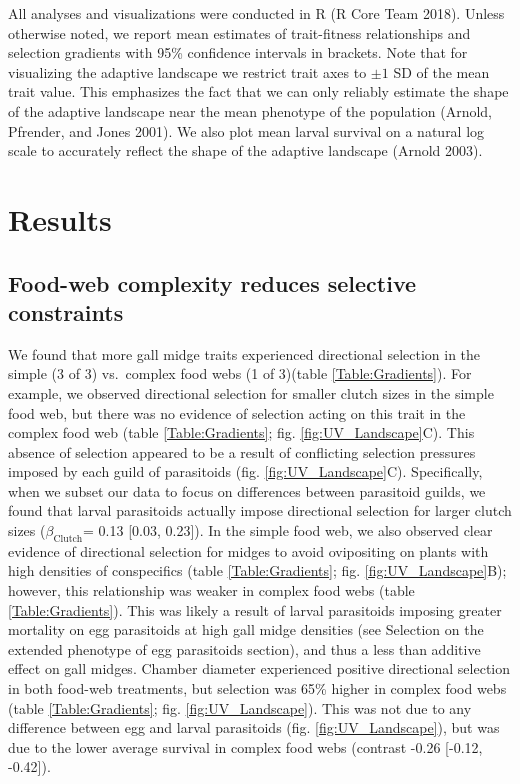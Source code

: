 \documentclass[11pt,]{article}
\begin{document}
All analyses and visualizations were conducted in R (R Core Team 2018).
Unless otherwise noted, we report mean estimates of trait-fitness
relationships and selection gradients with 95\% confidence intervals in
brackets. Note that for visualizing the adaptive landscape we restrict
trait axes to \(\pm 1\) SD of the mean trait value. This emphasizes the
fact that we can only reliably estimate the shape of the adaptive
landscape near the mean phenotype of the population (Arnold, Pfrender,
and Jones 2001). We also plot mean larval survival on a natural log
scale to accurately reflect the shape of the adaptive landscape (Arnold
2003).

\section{Results}\label{results}

\subsection{Food-web complexity reduces selective
constraints}\label{food-web-complexity-reduces-selective-constraints}

\indent We found that more gall midge traits experienced directional
selection in the simple (3 of 3) vs.~complex food webs (1 of 3)(table
\ref{Table:Gradients}). For example, we observed directional selection
for smaller clutch sizes in the simple food web, but there was no
evidence of selection acting on this trait in the complex food web
(table \ref{Table:Gradients}; fig. \ref{fig:UV_Landscape}C). This
absence of selection appeared to be a result of conflicting selection
pressures imposed by each guild of parasitoids (fig.
\ref{fig:UV_Landscape}C). Specifically, when we subset our data to focus
on differences between parasitoid guilds, we found that larval
parasitoids actually impose directional selection for larger clutch
sizes (\(\beta_{\text{Clutch}}\)= 0.13 {[}0.03, 0.23{]}). In the simple
food web, we also observed clear evidence of directional selection for
midges to avoid ovipositing on plants with high densities of
conspecifics (table \ref{Table:Gradients}; fig.
\ref{fig:UV_Landscape}B); however, this relationship was weaker in
complex food webs (table \ref{Table:Gradients}). This was likely a
result of larval parasitoids imposing greater mortality on egg
parasitoids at high gall midge densities (see Selection on the extended
phenotype of egg parasitoids section), and thus a less than additive
effect on gall midges. Chamber diameter experienced positive directional
selection in both food-web treatments, but selection was 65\% higher in
complex food webs (table \ref{Table:Gradients}; fig.
\ref{fig:UV_Landscape}). This was not due to any difference between egg
and larval parasitoids (fig. \ref{fig:UV_Landscape}), but was due to the
lower average survival in complex food webs (contrast -0.26 {[}-0.12,
-0.42{]}).
\end{document}
